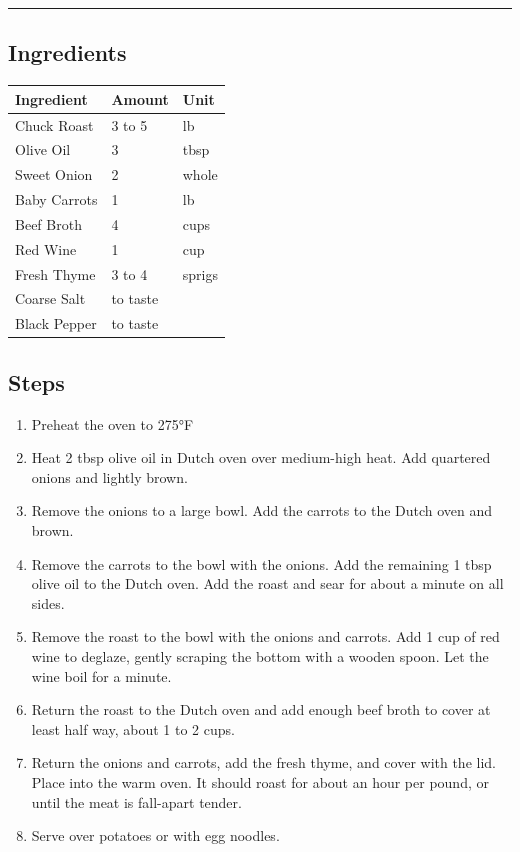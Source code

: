 \documentclass[11pt,]{article}
\begin{document}
\vspace{5 mm} \hrule 

\subsection{Ingredients}\label{ingredients-5}

\begin{tabular}{l|l|l}
\hline
Ingredient & Amount & Unit\\
\hline
Chuck Roast & 3 to 5 & lb\\
\hline
Olive Oil & 3 & tbsp\\
\hline
Sweet Onion & 2 & whole\\
\hline
Baby Carrots & 1 & lb\\
\hline
Beef Broth & 4 & cups\\
\hline
Red Wine & 1 & cup\\
\hline
Fresh Thyme & 3 to 4 & sprigs\\
\hline
Coarse Salt & to taste & \\
\hline
Black Pepper & to taste & \\
\hline
\end{tabular}

\subsection{Steps}\label{steps-5}

\begin{enumerate}
\def\labelenumi{\arabic{enumi}.}
\item
  Preheat the oven to 275°F
\item
  Heat 2 tbsp olive oil in Dutch oven over medium-high heat. Add
  quartered onions and lightly brown.
\item
  Remove the onions to a large bowl. Add the carrots to the Dutch oven
  and brown.
\item
  Remove the carrots to the bowl with the onions. Add the remaining 1
  tbsp olive oil to the Dutch oven. Add the roast and sear for about a
  minute on all sides.
\item
  Remove the roast to the bowl with the onions and carrots. Add 1 cup of
  red wine to deglaze, gently scraping the bottom with a wooden spoon.
  Let the wine boil for a minute.
\item
  Return the roast to the Dutch oven and add enough beef broth to cover
  at least half way, about 1 to 2 cups.
\item
  Return the onions and carrots, add the fresh thyme, and cover with the
  lid. Place into the warm oven. It should roast for about an hour per
  pound, or until the meat is fall-apart tender.
\item
  Serve over potatoes or with egg noodles.
\end{enumerate}
\end{document}
